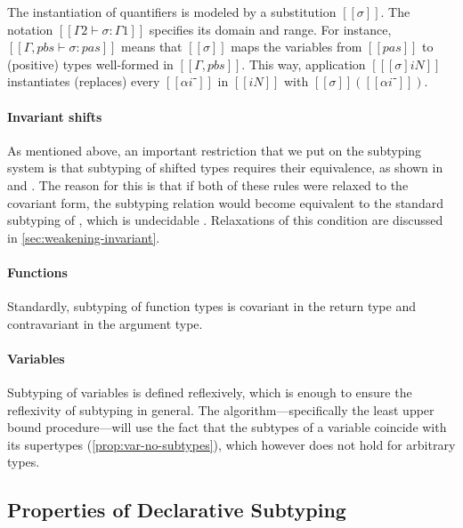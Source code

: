 The instantiation of quantifiers is modeled by a substitution $[[σ]]$.
The notation $[[Γ2 ⊢ σ : Γ1]]$ specifies its domain and range.
For instance, $[[Γ, pbs ⊢ σ : {pas}]]$ means that 
$[[σ]]$ maps the variables from $[[pas]]$ to (positive) types
well-formed in $[[Γ, pbs]]$.
This way, application $[[ [σ]iN ]]$ instantiates (replaces) every
$[[αi⁻]]$ in $[[iN]]$ with $[[σ]]([[αi⁻]])$.

\paragraph*{Invariant shifts}
As mentioned above, an important restriction that we put on the subtyping system
is that subtyping of shifted types requires their equivalence, as shown in
 and . The
reason for this is that if both of these rules were relaxed to the covariant
form, the subtyping relation would become equivalent to the standard subtyping
of \systemf, which is undecidable \cite{tiuryn-urzczyn-96}. 
Relaxations of this condition are discussed in \cref{sec:weakening-invariant}.


\paragraph*{Functions}
Standardly, subtyping of function types is covariant in the return type
and contravariant in the argument type.

\paragraph*{Variables}
Subtyping of variables is defined reflexively, which is enough to ensure the
reflexivity of subtyping in general. The algorithm---specifically the least
upper bound procedure---will use the fact that the subtypes of a variable
coincide with its supertypes (\cref{prop:var-no-subtypes}),
which however does not hold for arbitrary types.

\subsection{Properties of Declarative Subtyping}
\label{sec:decl-subtyping-properties}

